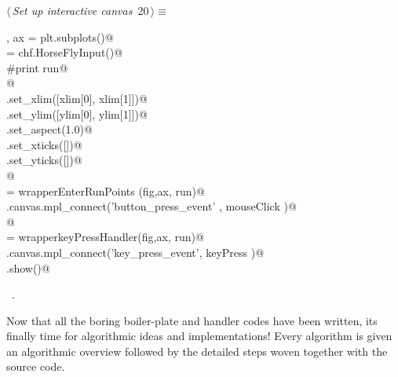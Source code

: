 \documentclass[12pt]{report}
\begin{document}
\begin{flushleft} \small
\begin{minipage}{\linewidth}\label{scrap8}\raggedright\small
{} $\langle\,${\itshape Set up interactive canvas}\nobreak\ {\footnotesize {20}}$\,\rangle\equiv$
\vspace{-1ex}
\begin{list}{}{} \item
\mbox{}\verb@fig, ax =  plt.subplots()@\\
\mbox{}\verb@run = chf.HorseFlyInput()@\\
\mbox{}\verb@#print run@\\
\mbox{}\verb@    @\\
\mbox{}\verb@ax.set_xlim([xlim[0], xlim[1]])@\\
\mbox{}\verb@ax.set_ylim([ylim[0], ylim[1]])@\\
\mbox{}\verb@ax.set_aspect(1.0)@\\
\mbox{}\verb@ax.set_xticks([])@\\
\mbox{}\verb@ax.set_yticks([])@\\
\mbox{}\verb@      @\\
\mbox{}\verb@mouseClick   = wrapperEnterRunPoints (fig,ax, run)@\\
\mbox{}\verb@fig.canvas.mpl_connect('button_press_event' , mouseClick )@\\
\mbox{}\verb@      @\\
\mbox{}\verb@keyPress     = wrapperkeyPressHandler(fig,ax, run)@\\
\mbox{}\verb@fig.canvas.mpl_connect('key_press_event', keyPress   )@\\
\mbox{}\verb@plt.show()@\\
\mbox{}\verb@@{\NWsep}
\end{list}
\vspace{-1.5ex}
\footnotesize
\begin{list}{}{\setlength{\itemsep}{-\parsep}\setlength{\itemindent}{-\leftmargin}}
\item \NWtxtMacroRefIn\ .

\item{}
\end{list}
\end{minipage}\vspace{4ex}
\end{flushleft}
Now that all the boring boiler-plate and handler codes have been 
written, its finally time for algorithmic ideas and implementations! 
Every algorithm is given an algorithmic overview followed by the 
detailed steps woven together with the source code. 
\end{document}

